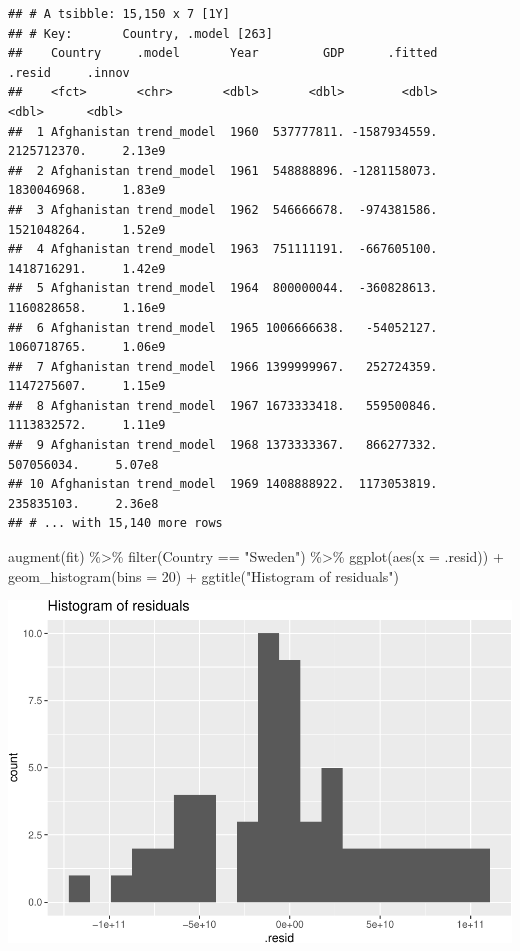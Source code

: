 \documentclass[
]{book}
\newenvironment{Shaded}{\begin{snugshade}}{\end{snugshade}}
\newcommand{\AttributeTok}[1]{\textcolor[rgb]{0.77,0.63,0.00}{#1}}
\newcommand{\DecValTok}[1]{\textcolor[rgb]{0.00,0.00,0.81}{#1}}
\newcommand{\FunctionTok}[1]{\textcolor[rgb]{0.00,0.00,0.00}{#1}}
\newcommand{\NormalTok}[1]{#1}
\newcommand{\SpecialCharTok}[1]{\textcolor[rgb]{0.00,0.00,0.00}{#1}}
\newcommand{\StringTok}[1]{\textcolor[rgb]{0.31,0.60,0.02}{#1}}
\begin{document}
\begin{verbatim}
## # A tsibble: 15,150 x 7 [1Y]
## # Key:       Country, .model [263]
##    Country     .model       Year         GDP      .fitted      .resid     .innov
##    <fct>       <chr>       <dbl>       <dbl>        <dbl>       <dbl>      <dbl>
##  1 Afghanistan trend_model  1960  537777811. -1587934559. 2125712370.     2.13e9
##  2 Afghanistan trend_model  1961  548888896. -1281158073. 1830046968.     1.83e9
##  3 Afghanistan trend_model  1962  546666678.  -974381586. 1521048264.     1.52e9
##  4 Afghanistan trend_model  1963  751111191.  -667605100. 1418716291.     1.42e9
##  5 Afghanistan trend_model  1964  800000044.  -360828613. 1160828658.     1.16e9
##  6 Afghanistan trend_model  1965 1006666638.   -54052127. 1060718765.     1.06e9
##  7 Afghanistan trend_model  1966 1399999967.   252724359. 1147275607.     1.15e9
##  8 Afghanistan trend_model  1967 1673333418.   559500846. 1113832572.     1.11e9
##  9 Afghanistan trend_model  1968 1373333367.   866277332.  507056034.     5.07e8
## 10 Afghanistan trend_model  1969 1408888922.  1173053819.  235835103.     2.36e8
## # ... with 15,140 more rows
\end{verbatim}

\begin{Shaded}
\begin{Highlighting}[]
\FunctionTok{augment}\NormalTok{(fit) }\SpecialCharTok{\%\textgreater{}\%} \FunctionTok{filter}\NormalTok{(Country }\SpecialCharTok{==} \StringTok{"Sweden"}\NormalTok{) }\SpecialCharTok{\%\textgreater{}\%}
  \FunctionTok{ggplot}\NormalTok{(}\FunctionTok{aes}\NormalTok{(}\AttributeTok{x =}\NormalTok{ .resid)) }\SpecialCharTok{+}
  \FunctionTok{geom\_histogram}\NormalTok{(}\AttributeTok{bins =} \DecValTok{20}\NormalTok{) }\SpecialCharTok{+}
  \FunctionTok{ggtitle}\NormalTok{(}\StringTok{"Histogram of residuals"}\NormalTok{)}
\end{Highlighting}
\end{Shaded}

\includegraphics{graphics/unnamed-chunk-35-1.pdf}
\end{document}

